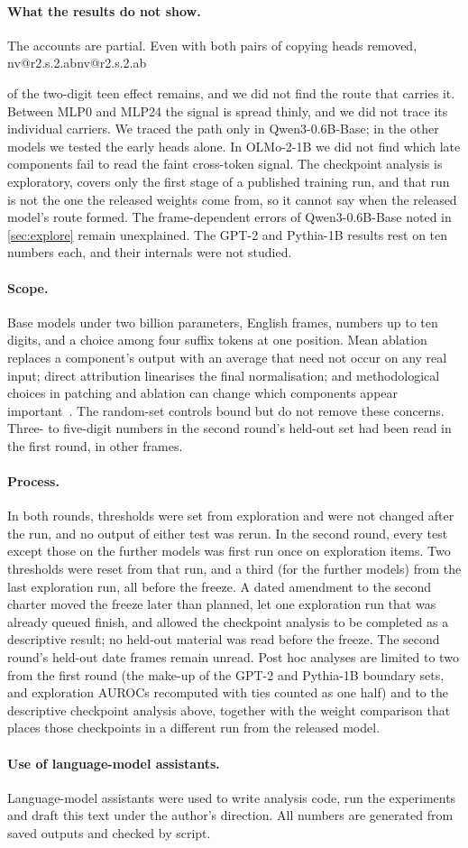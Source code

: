 \documentclass[11pt]{article}
\makeatletter
\newcommand{\nv}[1]{\ifcsname nv@#1\endcsname\csname nv@#1\endcsname\else\PackageError{numbers}{Unknown number key #1}{}\fi}
\newcommand{\qw}{Qwen3-0.6B-Base}
\newcommand{\ol}{OLMo-2-1B}
\newcommand{\mlp}[1]{MLP#1}
\makeatother
\begin{document}
\paragraph{What the results do not show.} The accounts are partial. Even with both pairs of copying heads removed, \nv{r2.s.2.ab} of the two-digit teen effect remains, and we did not find the route that carries it. Between \mlp{0} and \mlp{24} the signal is spread thinly, and we did not trace its individual carriers. We traced the path only in \qw{}; in the other models we tested the early heads alone. In \ol{} we did not find which late components fail to read the faint cross-token signal. The checkpoint analysis is exploratory, covers only the first stage of a published training run, and that run is not the one the released weights come from, so it cannot say when the released model's route formed. The frame-dependent errors of \qw{} noted in \cref{sec:explore} remain unexplained. The GPT-2 and Pythia-1B results rest on ten numbers each, and their internals were not studied.

\paragraph{Scope.} Base models under two billion parameters, English frames, numbers up to ten digits, and a choice among four suffix tokens at one position. Mean ablation replaces a component's output with an average that need not occur on any real input; direct attribution linearises the final normalisation; and methodological choices in patching and ablation can change which components appear important~\citep{heimersheim2024patching,zhang2024patching}. The random-set controls bound but do not remove these concerns. Three- to five-digit numbers in the second round's held-out set had been read in the first round, in other frames.

\paragraph{Process.} In both rounds, thresholds were set from exploration and were not changed after the run, and no output of either test was rerun. In the second round, every test except those on the further models was first run once on exploration items. Two thresholds were reset from that run, and a third (for the further models) from the last exploration run, all before the freeze. A dated amendment to the second charter moved the freeze later than planned, let one exploration run that was already queued finish, and allowed the checkpoint analysis to be completed as a descriptive result; no held-out material was read before the freeze. The second round's held-out date frames remain unread. Post hoc analyses are limited to two from the first round (the make-up of the GPT-2 and Pythia-1B boundary sets, and exploration AUROCs recomputed with ties counted as one half) and to the descriptive checkpoint analysis above, together with the weight comparison that places those checkpoints in a different run from the released model.

\paragraph{Use of language-model assistants.} Language-model assistants were used to write analysis code, run the experiments and draft this text under the author's direction. All numbers are generated from saved outputs and checked by script.



\end{document}
